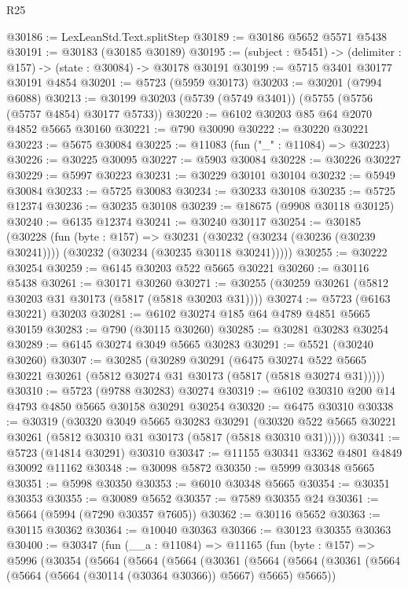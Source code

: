 \begin{lexlean}{R25}
\begin{coremodule}
@30186 := LexLeanStd.Text.splitStep
@30189 := @30186 @5652 @5571 @5438
@30191 := @30183 (@30185 @30189)
@30195 := (subject : @5451) -> (delimiter : @157) -> (state : @30084) -> @30178 @30191
@30199 := @5715 @3401 @30177 @30191 @4854
@30201 := @5723 (@5959 @30173)
@30203 := @30201 (@7994 @6088)
@30213 := @30199 @30203 (@5739 (@5749 @3401)) (@5755 (@5756 (@5757 @4854) @30177 @5733))
@30220 := @6102 @30203 @85 @64 @2070 @4852 @5665 @30160
@30221 := @790 @30090
@30222 := @30220 @30221
@30223 := @5675 @30084
@30225 := @11083 (fun ("_" : @11084) => @30223)
@30226 := @30225 @30095
@30227 := @5903 @30084
@30228 := @30226 @30227
@30229 := @5997 @30223
@30231 := @30229 @30101 @30104
@30232 := @5949 @30084
@30233 := @5725 @30083
@30234 := @30233 @30108
@30235 := @5725 @12374
@30236 := @30235 @30108
@30239 := @18675 (@9908 @30118 @30125)
@30240 := @6135 @12374
@30241 := @30240 @30117
@30254 := @30185
    (@30228
      (fun (byte : @157) =>
      @30231 (@30232 (@30234 (@30236 (@30239 @30241)))) (@30232 (@30234 (@30235 @30118 @30241)))))
@30255 := @30222 @30254
@30259 := @6145 @30203 @522 @5665 @30221
@30260 := @30116 @5438
@30261 := @30171 @30260
@30271 := @30255 (@30259 @30261 (@5812 @30203 @31 @30173 (@5817 (@5818 @30203 @31))))
@30274 := @5723 (@6163 @30221) @30203
@30281 := @6102 @30274 @185 @64 @4789 @4851 @5665 @30159
@30283 := @790 (@30115 @30260)
@30285 := @30281 @30283 @30254
@30289 := @6145 @30274 @3049 @5665 @30283
@30291 := @5521 (@30240 @30260)
@30307 := @30285
    (@30289
      @30291
      (@6475 @30274 @522 @5665 @30221 @30261 (@5812 @30274 @31 @30173 (@5817 (@5818 @30274 @31)))))
@30310 := @5723 (@9788 @30283) @30274
@30319 := @6102 @30310 @200 @14 @4793 @4850 @5665 @30158 @30291 @30254
@30320 := @6475 @30310
@30338 := @30319
    (@30320
      @3049
      @5665
      @30283
      @30291
      (@30320 @522 @5665 @30221 @30261 (@5812 @30310 @31 @30173 (@5817 (@5818 @30310 @31)))))
@30341 := @5723 (@14814 @30291) @30310
@30347 := @11155 @30341 @3362 @4801 @4849 @30092 @11162
@30348 := @30098 @5872
@30350 := @5999 @30348 @5665
@30351 := @5998 @30350
@30353 := @6010 @30348 @5665
@30354 := @30351 @30353
@30355 := @30089 @5652
@30357 := @7589 @30355 @24
@30361 := @5664 (@5994 (@7290 @30357 @7605))
@30362 := @30116 @5652
@30363 := @30115 @30362
@30364 := @10040 @30363
@30366 := @30123 @30355 @30363
@30400 := @30347
    (fun (__a : @11084) =>
    @11165
      (fun (byte : @157) =>
      @5996
        (@30354
          (@5664
            (@5664
              (@5664
                (@30361
                  (@5664
                    (@5664
                      (@30361 (@5664 (@5664 (@5664 (@30114 (@30364 @30366)) @5667) @5665) @5665))

\end{coremodule}
\end{lexlean}
